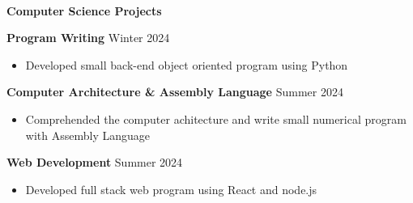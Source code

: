 \begin{flushleft}
    \hrulefill \\
    \begin{large}
        \textbf{Computer Science Projects} \\
    \end{large} 
\end{flushleft}
\textbf{Program Writing} \hfill Winter 2024
\begin{itemize}
    \item Developed small back-end object oriented program using Python
\end{itemize}
\textbf{Computer Architecture \& Assembly Language} \hfill Summer 2024
\begin{itemize}
    \item Comprehended the computer achitecture and write small numerical program with Assembly Language
\end{itemize}
\textbf{Web Development} \hfill Summer 2024
\begin{itemize}
    \item Developed full stack web program using React and node.js
\end{itemize}
